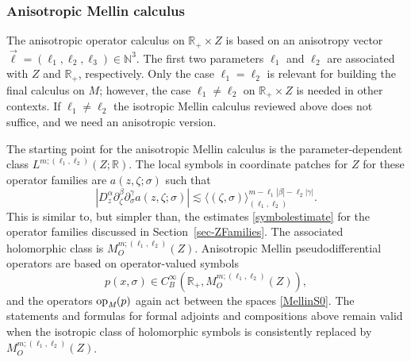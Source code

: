 \documentclass[reqno]{amsart}
\numberwithin{equation}{section}
\theoremstyle{definition}
\def\N{\mathbb N}
\def\R{\mathbb R}
\def\opm{\textup{op}_{\textit{M}}}
\begin{document}
\subsubsection*{Anisotropic Mellin calculus}

The anisotropic operator calculus on $\R_+ \times Z$ is based on an anisotropy vector $\vec{\ell} = (\ell_1,\ell_2,\ell_3) \in \N^3$. The first two parameters $\ell_1$ and $\ell_2$ are associated with $Z$ and $\R_+$, respectively. Only the case $\ell_1=\ell_2$ is relevant for building the final calculus on $M$; however, the case $\ell_1 \neq \ell_2$ on $\R_+\times Z$ is needed in other contexts. If $\ell_1 \neq \ell_2$ the isotropic Mellin calculus reviewed above does not suffice, and we need an anisotropic version.

The starting point for the anisotropic Mellin calculus is the parameter-dependent class $L^{m;(\ell_1,\ell_2)}(Z;\R)$. The local symbols in coordinate patches for $Z$ for these operator families are $a(z,\zeta;\sigma)$ such that
$$
|D_z^{\alpha}\partial_{\zeta}^{\beta}\partial_{\sigma}^{\gamma}a(z,\zeta;\sigma)| \lesssim \langle (\zeta,\sigma) \rangle_{(\ell_1,\ell_2)}^{m-\ell_1|\beta|-\ell_2|\gamma|}.
$$
This is similar to, but simpler than, the estimates \eqref{symbolestimate} for the operator families discussed in Section~\ref{sec-ZFamilies}. The associated holomorphic class is $M_O^{m;(\ell_1,\ell_2)}(Z)$. Anisotropic Mellin pseudodifferential operators are based on operator-valued symbols
$$
p(x,\sigma) \in C^{\infty}_B(\R_+,M_O^{m;(\ell_1,\ell_2)}(Z)),
$$
and the operators $\opm(p)$ again act between the spaces \eqref{MellinS0}. The statements and formulas for formal adjoints and compositions above remain valid when the isotropic class of holomorphic symbols is consistently replaced by $M_O^{m;(\ell_1,\ell_2)}(Z)$.
\end{document}
